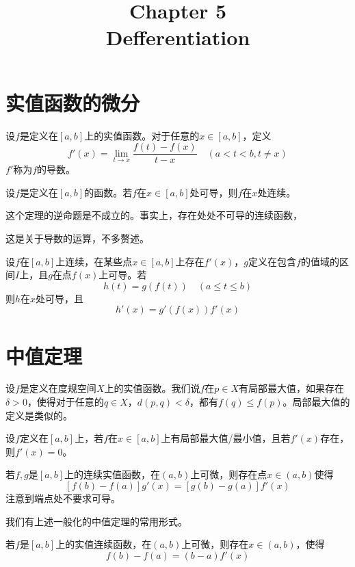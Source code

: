 \documentclass{article}
\title{\Huge \textbf{Chapter 5}\\
Defferentiation}
\newcommand{\ra}{\rightarrow}
\begin{document}
\maketitle
\section{实值函数的微分}
\begin{definition}
    设\(f\)是定义在\([a,b]\)上的实值函数。对于任意的\(x\in[a,b]\)，定义\[
f'(x) =\lim_{t\ra x} \frac{f(t)-f(x)}{t-x} \quad(a<t<b,t\neq x)
\] \(f'\)称为\(f\)的导数。
\end{definition}

\begin{theorem}
    设\(f\)是定义在\([a,b]\)的函数。若\(f\)在\(x\in[a,b]\)处可导，则\(f\)在\(x\)处连续。
\end{theorem}
这个定理的逆命题是不成立的。事实上，存在处处不可导的连续函数，

\begin{theorem}
    这是关于导数的运算，不多赘述。
\end{theorem}
\begin{theorem}
    设\(f\)在\([a,b]\)上连续，在某些点\(x\in[a,b]\)上存在\(f'(x)\)，\(g\)定义在包含\(f\)的值域的区间\(I\)上，且\(g\)在点\(f(x)\)上可导。若\[
    h(t)=g(f(t))\quad(a\leq t\leq b)
    \]则\(h\)在\(x\)处可导，且\[
    h'(x)=g'(f(x))f'(x)
    \]
\end{theorem}

\section{中值定理}

\begin{definition}
    设\(f\)是定义在度规空间\(X\)上的实值函数。我们说\(f\)在\(p\in X\)有局部最大值，如果存在\(\delta>0\)，使得对于任意的\(q\in X\)，\(d(p,q)<\delta\)，都有\(f(q)\leq f(p)\)。局部最大值的定义是类似的。
\end{definition}

\begin{theorem}
    设\(f\)定义在\([a,b]\)上，若\(f\)在\(x\in[a,b]\)上有局部最大值/最小值，且若\(f'(x)\)存在，则\(f'(x)=0\)。
\end{theorem}

\begin{theorem}
    若\(f,g\)是\([a,b]\)上的连续实值函数，在\((a,b)\)上可微，则存在点\(x\in(a,b)\)使得\[
    [f(b)-f(a)]g'(x) =[g(b)-g(a)]f'(x)
    \]注意到端点处不要求可导。
\end{theorem}
我们有上述一般化的中值定理的常用形式。
\begin{theorem}
    若\(f\)是\([a,b]\)上的实值连续函数，在\((a,b)\)上可微，则存在\(x\in(a,b)\)，使得\[
    f(b)-f(a)=(b-a)f'(x)
    \]
\end{theorem}
\end{document}
